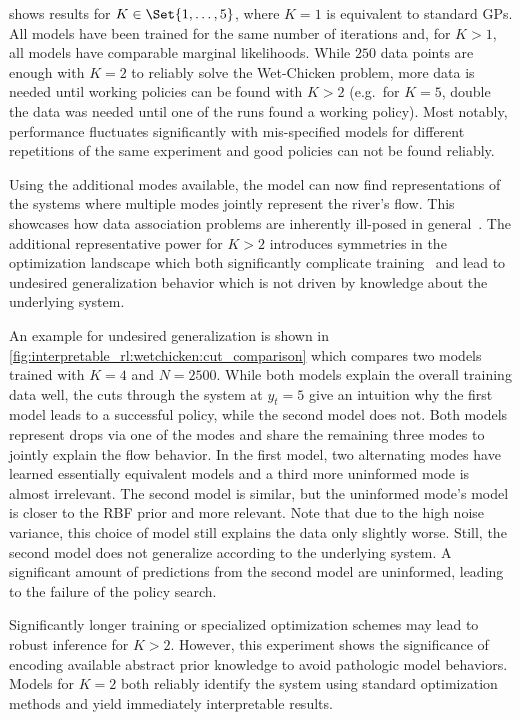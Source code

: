  shows results for $K \in \Set{1, \dots, 5}$, where $K=1$ is equivalent to standard GPs.
All models have been trained for the same number of iterations and, for $K > 1$, all models have comparable marginal likelihoods.
While $250$ data points are enough with $K=2$ to reliably solve the Wet-Chicken problem, more data is needed until working policies can be found with $K>2$ (e.g.\ for $K=5$, double the data was needed until one of the runs found a working policy).
Most notably, performance fluctuates significantly with mis-specified models for different repetitions of the same experiment and good policies can not be found reliably.

Using the additional modes available, the model can now find representations of the systems where multiple modes jointly represent the river's flow.
This showcases how data association problems are inherently ill-posed in general~\parencite{barshalom_tracking_1990,cox_review_1993}.
The additional representative power for $K>2$ introduces symmetries in the optimization landscape which both significantly complicate training~\parencite{lazaro-gredilla_overlapping_2012,minka_expectation_2001} and lead to undesired generalization behavior which is not driven by knowledge about the underlying system.

An example for undesired generalization is shown in \cref{fig:interpretable_rl:wetchicken:cut_comparison} which compares two models trained with $K=4$ and $N=2500$.
While both models explain the overall training data well, the cuts through the system at $y_t = 5$ give an intuition why the first model leads to a successful policy, while the second model does not.
Both models represent drops via one of the modes and share the remaining three modes to jointly explain the flow behavior.
In the first model, two alternating modes have learned essentially equivalent models and a third more uninformed mode is almost irrelevant.
The second model is similar, but the uninformed mode's model is closer to the RBF prior and more relevant.
Note that due to the high noise variance, this choice of model still explains the data only slightly worse.
Still, the second model does not generalize according to the underlying system.
A significant amount of predictions from the second model are uninformed, leading to the failure of the policy search.

Significantly longer training or specialized optimization schemes may lead to robust inference for $K>2$.
However, this experiment shows the significance of encoding available abstract prior knowledge to avoid pathologic model behaviors.
Models for $K=2$ both reliably identify the system using standard optimization methods and yield immediately interpretable results.


